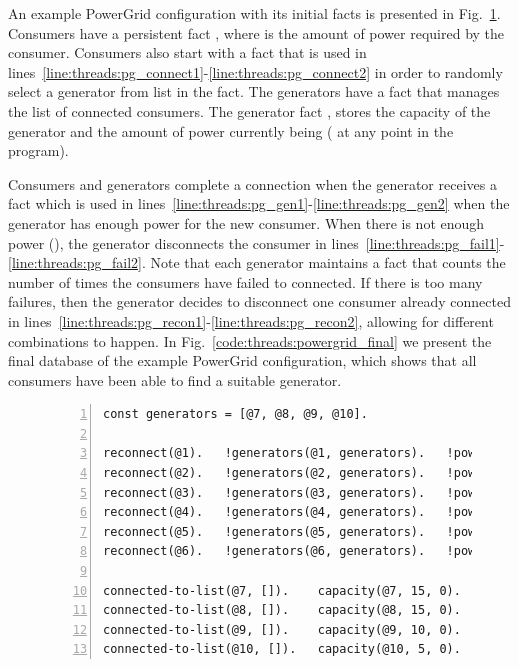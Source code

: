 An example PowerGrid configuration with its initial facts is presented in
Fig.~\ref{code:threads:powergrid_init}. Consumers have a persistent fact
, where  is the amount of power required by the
consumer. Consumers also start with a
 fact that is used in
lines~\ref{line:threads:pg_connect1}-\ref{line:threads:pg_connect2} in order to
randomly select a generator from list  in the 
fact. The generators have a  fact that manages the
list of connected consumers. The generator fact ,
stores the  capacity of the generator and the amount of power
currently being  ( at any point in the program).

Consumers and generators complete a connection when the generator receives a
 fact which is used in
lines~\ref{line:threads:pg_gen1}-\ref{line:threads:pg_gen2} when the generator
has enough power for the new consumer. When there is not enough power
(), the generator disconnects the consumer in
lines~\ref{line:threads:pg_fail1}-\ref{line:threads:pg_fail2}. Note that each
generator maintains a  fact that counts the number of times the
consumers have failed to connected. If there is too many failures, then the
generator decides to disconnect one consumer already connected in
lines~\ref{line:threads:pg_recon1}-\ref{line:threads:pg_recon2}, allowing for
different combinations to happen. In Fig.~\ref{code:threads:powergrid_final} we
present the final database of the example PowerGrid configuration, which shows
that all consumers have been able to find a suitable generator.

\begin{figure}[h!]
\begin{Verbatim}[numbers=left,fontsize=\codesize,commandchars=*\#\&]
const generators = [@7, @8, @9, @10].

reconnect(@1).   !generators(@1, generators).   !power(@1, 5).
reconnect(@2).   !generators(@2, generators).   !power(@2, 10).
reconnect(@3).   !generators(@3, generators).   !power(@3, 5).
reconnect(@4).   !generators(@4, generators).   !power(@4, 10).
reconnect(@5).   !generators(@5, generators).   !power(@5, 10).
reconnect(@6).   !generators(@6, generators).   !power(@6, 5).

connected-to-list(@7, []).    capacity(@7, 15, 0).   fail(@7, 0).
connected-to-list(@8, []).    capacity(@8, 15, 0).   fail(@8, 0).
connected-to-list(@9, []).    capacity(@9, 10, 0).   fail(@9, 0).
connected-to-list(@10, []).   capacity(@10, 5, 0).   fail(@10, 0).
\end{Verbatim}
\label{code:threads:powergrid_init}
\end{figure}

